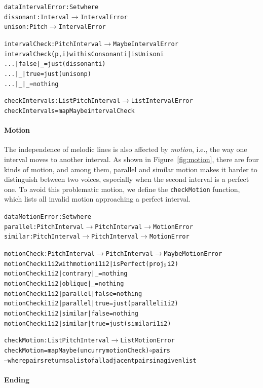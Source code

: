 \begin{alltt}
data IntervalError : Set where
  dissonant : Interval \(\rightarrow\) IntervalError
  unison    : Pitch \(\rightarrow\) IntervalError

intervalCheck : PitchInterval \(\rightarrow\) Maybe IntervalError
intervalCheck (p , i) with isConsonant i | isUnison i
... | false | _    = just (dissonant i)
... | _     | true = just (unison p)
... | _     | _    = nothing

checkIntervals : List PitchInterval \(\rightarrow\) List IntervalError
checkIntervals = mapMaybe intervalCheck
\end{alltt}

\paragraph{Motion}

\Motion

The independence of melodic lines is also affected by \emph{motion},
i.e., the way one interval moves to another interval.
As shown in Figure~\ref{fig:motion}, there are four kinds of motion,
and among them, parallel and similar motion makes it harder to
distinguish between two voices, especially when the second interval
is a perfect one.
To avoid this problematic motion, we define the \texttt{checkMotion}
function, which lists all invalid motion approaching a perfect interval.

\begin{alltt}
data MotionError : Set where
  parallel : PitchInterval \(\rightarrow\) PitchInterval \(\rightarrow\) MotionError
  similar  : PitchInterval \(\rightarrow\) PitchInterval \(\rightarrow\) MotionError

motionCheck : PitchInterval \(\rightarrow\) PitchInterval \(\rightarrow\) Maybe MotionError
motionCheck i1 i2 with motion i1 i2 | isPerfect (proj\(\sb{\mathtt{2}}\) i2)
motionCheck i1 i2 | contrary | \_     = nothing
motionCheck i1 i2 | oblique  | \_     = nothing
motionCheck i1 i2 | parallel | false = nothing
motionCheck i1 i2 | parallel | true  = just (parallel i1 i2)
motionCheck i1 i2 | similar  | false = nothing
motionCheck i1 i2 | similar  | true  = just (similar i1 i2)

checkMotion : List PitchInterval \(\rightarrow\) List MotionError
checkMotion = mapMaybe (uncurry motionCheck) \(\circ\) pairs
-- where pairs returns a list of all adjacent pairs in a given list
\end{alltt}

\paragraph{Ending}

